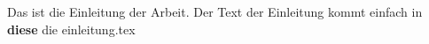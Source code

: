 Das ist die Einleitung der Arbeit.
Der Text der Einleitung kommt einfach in \textbf{diese} die einleitung.tex
